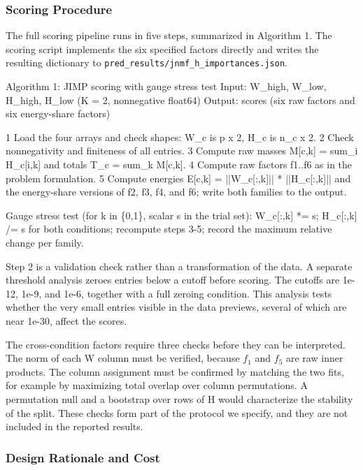 \documentclass{article}
\begin{document}
\subsubsection{Scoring Procedure}

\label{sec:scoring_procedure}

The full scoring pipeline runs in five steps, summarized in Algorithm 1. The scoring script implements the six specified factors directly and writes the resulting dictionary to \texttt{pred\_results/jnmf\_h\_importances.json}.

Algorithm 1: JIMP scoring with gauge stress test
Input: W\_high, W\_low, H\_high, H\_low (K = 2, nonnegative float64)
Output: scores (six raw factors and six energy-share factors)

1 Load the four arrays and check shapes: W\_c is p x 2, H\_c is n\_c x 2.
2 Check nonnegativity and finiteness of all entries.
3 Compute raw masses M[c,k] = sum\_i H\_c[i,k] and totals T\_c = sum\_k M[c,k].
4 Compute raw factors f1..f6 as in the problem formulation.
5 Compute energies E[c,k] = ||W\_c[:,k]|| * ||H\_c[:,k]|| and the energy-share
 versions of f2, f3, f4, and f6; write both families to the output.

Gauge stress test (for k in \{0,1\}, scalar s in the trial set):
 W\_c[:,k] *= s; H\_c[:,k] /= s for both conditions;
 recompute steps 3-5; record the maximum relative change per family.

Step 2 is a validation check rather than a transformation of the data. A separate threshold analysis zeroes entries below a cutoff before scoring. The cutoffs are 1e-12, 1e-9, and 1e-6, together with a full zeroing condition. This analysis tests whether the very small entries visible in the data previews, several of which are near 1e-30, affect the scores.

The cross-condition factors require three checks before they can be interpreted. The norm of each W column must be verified, because $f_1$ and $f_5$ are raw inner products. The column assignment must be confirmed by matching the two fits, for example by maximizing total overlap over column permutations. A permutation null and a bootstrap over rows of H would characterize the stability of the split. These checks form part of the protocol we specify, and they are not included in the reported results.

\subsubsection{Design Rationale and Cost}
\end{document}
